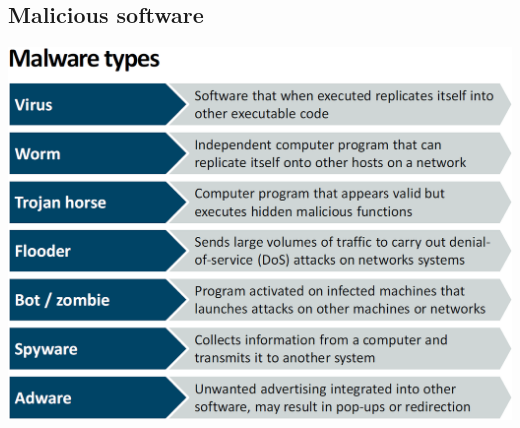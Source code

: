 \documentclass[12pt]{article}
\begin{document}
 \subsection{Malicious software}
 \includegraphics[width=\linewidth]{./slides/L8P3MWT.png}
\end{document}
